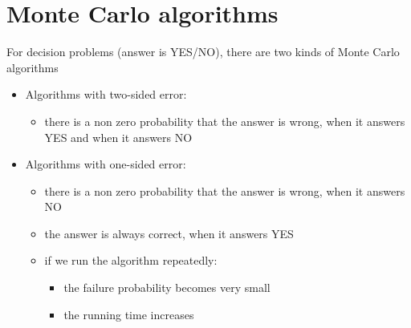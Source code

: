 \documentclass{article}[18pt]
\begin{document}
\section{Monte Carlo algorithms}
For decision problems (answer is YES/NO), there are two kinds of Monte Carlo algorithms
\begin{itemize}
	\item Algorithms with two-sided error:
	\begin{itemize}
		\item there is a non zero probability that the answer is wrong, when it answers YES and when it answers NO
	\end{itemize}
	\item Algorithms with one-sided error:
	\begin{itemize}
		\item there is a non zero probability that the answer is wrong, when it answers NO
		\item the answer is always correct, when it answers YES
		\item if we run the algorithm repeatedly:
		\begin{itemize}
			\item the failure probability becomes very small
			\item the running time increases
		\end{itemize}
	\end{itemize}
\end{itemize}
\end{document}
